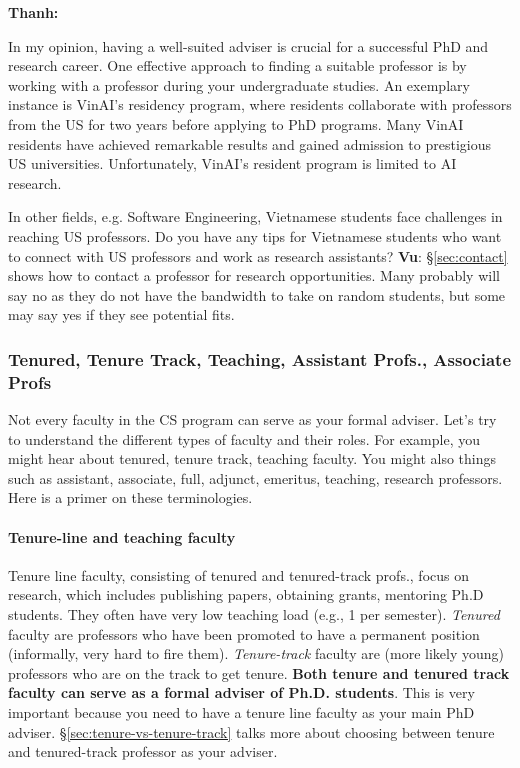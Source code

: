 \documentclass[11pt]{article}
\newenvironment{commentbox}[1][]{
\small
    \begin{mybox}
    {\small \textbf{#1}}
 }{
   \end{mybox}
}
\begin{document}
\begin{commentbox}[Thanh:]
    In my opinion, having a well-suited adviser is crucial for a successful PhD and research career. One effective approach to finding a suitable professor is by working with a professor during your undergraduate studies. An exemplary instance is VinAI's residency program, where residents collaborate with professors from the US for two years before applying to PhD programs. Many VinAI residents have achieved remarkable results and gained admission to prestigious US universities. Unfortunately, VinAI's resident program is limited to AI research. 
    
    In other fields, e.g. Software Engineering, Vietnamese students face challenges in reaching US professors. Do you have any tips for Vietnamese students who want to connect with US professors and work as research assistants? 
    \tcblower
    \textbf{Vu}: \S\ref{sec:contact} shows how to contact a professor for research opportunities. Many probably will say no as they do not have the bandwidth to take on random students, but some may say yes if they see potential fits.  
\end{commentbox}





\subsubsection{Tenured, Tenure Track, Teaching,  Assistant Profs., Associate Profs}
Not every faculty in the CS program can serve as your formal adviser. Let's try to understand the different types of faculty and their roles. For example, you might hear about tenured,  tenure track, teaching faculty.  You might also things such as assistant, associate, full, adjunct, emeritus, teaching, research professors. Here is a primer on these terminologies.

\paragraph{Tenure-line and teaching faculty} Tenure line faculty, consisting of tenured and tenured-track profs., focus on research, which includes publishing papers, obtaining grants, mentoring Ph.D students.  They often have very low teaching load (e.g., 1 per semester). \emph{Tenured} faculty are professors who have been promoted to have a permanent position (informally, very hard to fire them).   \emph{Tenure-track} faculty are (more likely young) professors who are on the track to get tenure.  \textbf{Both tenure and tenured track faculty can serve as a formal adviser of Ph.D. students}. This is very important because you need to have a tenure line faculty as your main PhD adviser. \S\ref{sec:tenure-vs-tenure-track} talks more about choosing between tenure and tenured-track professor as your adviser.
\end{document}
